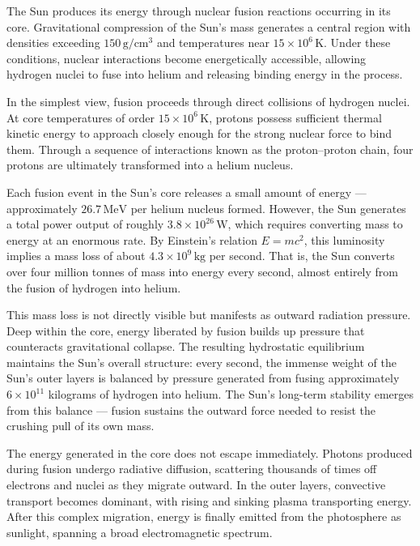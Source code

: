 The Sun produces its energy through nuclear fusion reactions occurring in its core. Gravitational compression of the Sun’s mass generates a central region with densities exceeding $150\,\text{g}/\text{cm}^3$ and temperatures near $15 \times 10^6\,\text{K}$. Under these conditions, nuclear interactions become energetically accessible, allowing hydrogen nuclei to fuse into helium and releasing binding energy in the process.

In the simplest view, fusion proceeds through direct collisions of hydrogen nuclei. At core temperatures of order $15 \times 10^6\,\text{K}$, protons possess sufficient thermal kinetic energy to approach closely enough for the strong nuclear force to bind them. Through a sequence of interactions known as the proton–proton chain, four protons are ultimately transformed into a helium nucleus. 

Each fusion event in the Sun's core releases a small amount of energy — approximately $26.7\,\text{MeV}$ per helium nucleus formed. However, the Sun generates a total power output of roughly $3.8 \times 10^{26}\,\text{W}$, which requires converting mass to energy at an enormous rate. By Einstein’s relation $E = mc^2$, this luminosity implies a mass loss of about $4.3 \times 10^9\,\text{kg}$ per second. That is, the Sun converts over four million tonnes of mass into energy every second, almost entirely from the fusion of hydrogen into helium.

This mass loss is not directly visible but manifests as outward radiation pressure. Deep within the core, energy liberated by fusion builds up pressure that counteracts gravitational collapse. The resulting hydrostatic equilibrium maintains the Sun’s overall structure: every second, the immense weight of the Sun's outer layers is balanced by pressure generated from fusing approximately $6 \times 10^{11}$ kilograms of hydrogen into helium. The Sun's long-term stability emerges from this balance — fusion sustains the outward force needed to resist the crushing pull of its own mass.

The energy generated in the core does not escape immediately. Photons produced during fusion undergo radiative diffusion, scattering thousands of times off electrons and nuclei as they migrate outward. In the outer layers, convective transport becomes dominant, with rising and sinking plasma transporting energy. After this complex migration, energy is finally emitted from the photosphere as sunlight, spanning a broad electromagnetic spectrum.

